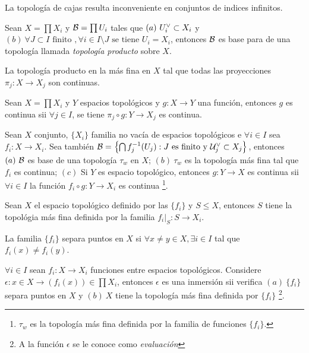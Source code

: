 \begin{note}
    La topología de cajas resulta inconveniente en conjuntos de indices infinitos. 
\end{note}
\begin{proposition}
    Sean \(X=\prod X_i\) y \(\mathcal{B} = \prod U_i\) tales que \((a) \ U_i^\ab\subset X_i\) y \((b) \ \forall J\subset I\text{ finito }, \forall i \in I\setminus J \text{ se tiene } U_i = X_i \), entonces \(\mathcal{B}\) es base para de una topología llamada \emph{topología producto} sobre \(X\).  
\end{proposition}
\begin{proposition}
    La topología producto en la más fina en \(X\) tal que todas las proyecciones \(\pi_j:X\to X_j\) son continuas. 
\end{proposition}
\begin{proposition}
    Sean \(X = \prod X_i\) y \(Y\) espacios topológicos y \(g:X\to Y\) una función, entonces \(g\) es continua sii \(\forall j\in I\), se tiene \( \pi_j\circ g: Y \to X_j\) es continua. 
\end{proposition}
\begin{proposition}
    Sean \(X\) conjunto, \(\{X_i\}\) familia no vacía de espacios topológicos e \(\forall i \in I\) sea \(f_i:X\to X_i\). Sea también \(\B = \left\{\bigcap f_j^{-1}(U_j): J\text{ es finito y } \U_j^\ab\subset X_j\right\}\), entonces \((a) \ \B\) es base de una topología \(\tau_w\) en \(X\); \((b)\ \tau_w\) es la topología más fina tal que \(f_i\) es continua; \((c)\) Si \(Y\) es espacio topológico, entonces \(g:Y\to X\) es continua sii \(\forall i\in I\) la función \(f_i\circ g: Y \to X_i\) es continua \footnote{\(\tau_w\) es la topología más fina definida por la familia de funciones \(\{f_i\}\).}. 
\end{proposition}
\begin{proposition}
    Sean \(X\) el espacio topológico definido por las \(\{f_i\}\) y \(S\leq X \), entonces \(S\) tiene la topológia más fina definida por la familia \(f_i|_S: S\to X_i\). 
\end{proposition}
\begin{definition}
    La familia \(\{f_i\}\) separa puntos en \(X\) si \(\forall x\neq y \in X, \exists i\in I\) tal que \(f_i(x)\neq f_i(y)\).  
\end{definition}
\begin{proposition}
    \(\forall i \in I\) sean \(f_i:X\to X_i\) funciones entre espacios topológicos. Considere \(\epsilon : x\in X \rightarrow (f_i(x)) \in \prod X_i\), entonces \(\epsilon \) es una inmersión sii verifica \((a)\ \{f_i\} \) separa puntos en \(X\) y \((b)\ X\) tiene la topología más fina definida por \(\{f_i\}\) \footnote{A la función \(\epsilon\) se le conoce como \emph{evaluación}}. 
\end{proposition}